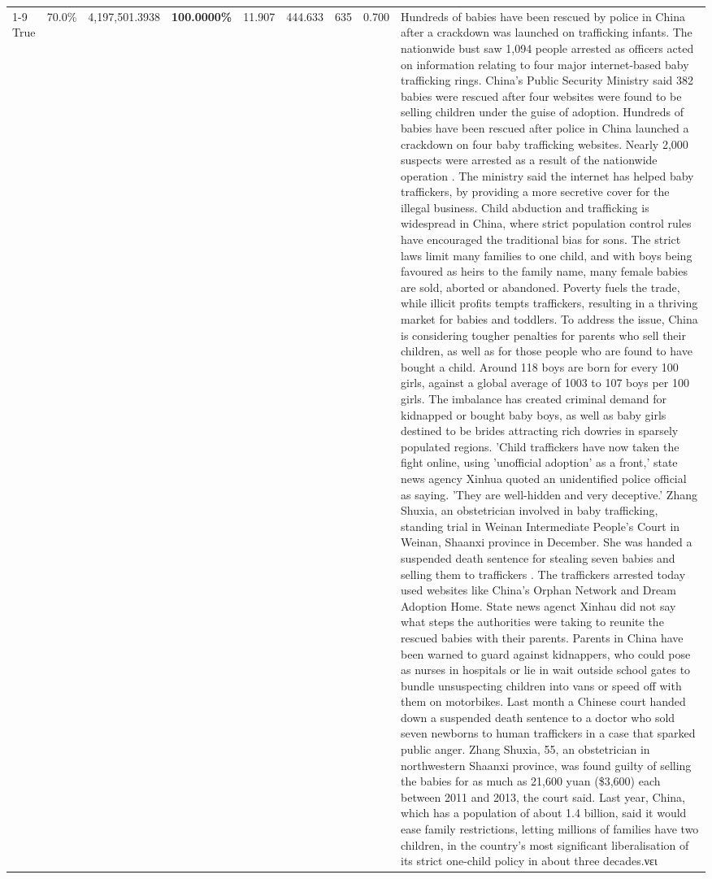 \begin{table}[H]
\begin{tabular}{lllrlllll}
\cline{1-9}
True & 70.0\% & 4,197,501.3938 & \bfseries \color{red} 100.0000\% & 11.907 & 444.633 & 635 & 0.700 & Hundreds of babies have been rescued by police in China after a crackdown was launched on trafficking infants. The nationwide bust saw 1,094 people arrested as officers acted on information relating to four major internet-based baby trafficking rings. China's Public Security Ministry said 382 babies were rescued after four websites were found to be selling children under the guise of adoption. Hundreds of babies have been rescued after police in China launched a crackdown on four baby trafficking websites. Nearly 2,000 suspects were arrested as a result of the nationwide operation . The ministry said the internet has helped baby traffickers, by providing a more secretive cover for the illegal business. Child abduction and trafficking is widespread in China, where strict population control rules have encouraged the traditional bias for sons. The strict laws limit many families to one child, and with boys being favoured as heirs to the family name, many female babies are sold, aborted or abandoned. Poverty fuels the trade, while illicit profits tempts traffickers, resulting in a thriving market for babies and toddlers. To address the issue, China is considering tougher penalties for parents who sell their children, as well as for those people who are found to have bought a child. Around 118 boys are born for every 100 girls, against a global average of 1003 to 107 boys per 100 girls. The imbalance has created criminal demand for kidnapped or bought baby boys, as well as baby girls destined to be brides attracting rich dowries in sparsely populated regions. 'Child traffickers have now taken the fight online, using 'unofficial adoption' as a front,' state news agency Xinhua quoted an unidentified police official as saying. 'They are well-hidden and very deceptive.' Zhang Shuxia, an obstetrician involved in baby trafficking, standing trial in Weinan Intermediate People's Court in Weinan, Shaanxi province in December. She was handed a suspended death sentence for stealing seven babies and selling them to traffickers . The traffickers arrested today used websites like China's Orphan Network and Dream Adoption Home. State news agenct Xinhau did not say what steps the authorities were taking to reunite the rescued babies with their parents. Parents in China have been warned to guard against kidnappers, who could pose as nurses in hospitals or lie in wait outside school gates to bundle unsuspecting children into vans or speed off with them on motorbikes. Last month a Chinese court handed down a suspended death sentence to a doctor who sold seven newborns to human traffickers in a case that sparked public anger. Zhang Shuxia, 55, an obstetrician in northwestern Shaanxi province, was found guilty of selling the babies for as much as 21,600 yuan (\$3,600) each between 2011 and 2013, the court said. Last year, China, which has a population of about 1.4 billion, said it would ease family restrictions, letting millions of families have two children, in the country's most significant liberalisation of its strict one-child policy in about three decades.νει \\

\end{tabular}
\end{table}
